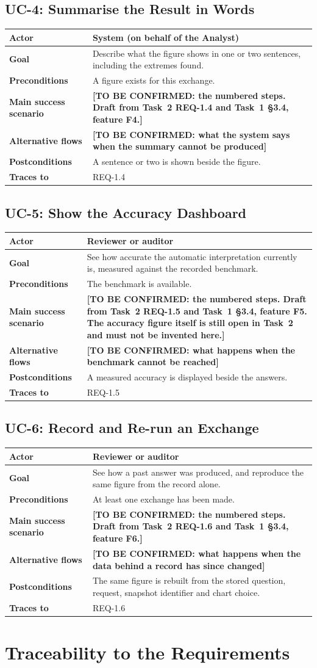 \documentclass[12pt,a4paper]{report}
\makeatletter
\newcommand{\tbd}[1]{{\color{red}\textbf{[TO BE CONFIRMED: #1]}}}
\newcommand{\ucdesc}[7]{%
  \begin{table}[H]
  \centering
  {\small
  \setlength{\tabcolsep}{4.5pt}
  \begin{tabular}{@{}>{\bfseries}p{2.9cm} >{\raggedright\arraybackslash}p{12.2cm}@{}}
    \toprule[1.5pt]
    Actor & #1 \\ \midrule
    Goal & #2 \\ \midrule
    Preconditions & #3 \\ \midrule
    Main success scenario & #4 \\ \midrule
    Alternative flows & #5 \\ \midrule
    Postconditions & #6 \\ \midrule
    Traces to & #7 \\
    \bottomrule[1.5pt]
  \end{tabular}}
  \end{table}
}
\makeatother
\begin{document}
\subsection{UC-4: Summarise the Result in Words}
\label{uc:4}
\ucdesc{System (on behalf of the Analyst)}
  {Describe what the figure shows in one or two sentences, including the
   extremes found.}
  {A figure exists for this exchange.}
  {\tbd{the numbered steps. Draft from Task~2 REQ-1.4 and Task~1 \S3.4,
   feature F4.}}
  {\tbd{what the system says when the summary cannot be produced}}
  {A sentence or two is shown beside the figure.}
  {REQ-1.4}

\subsection{UC-5: Show the Accuracy Dashboard}
\label{uc:5}
\ucdesc{Reviewer or auditor}
  {See how accurate the automatic interpretation currently is, measured
   against the recorded benchmark.}
  {The benchmark is available.}
  {\tbd{the numbered steps. Draft from Task~2 REQ-1.5 and Task~1 \S3.4,
   feature F5. \textbf{The accuracy figure itself is still open in Task~2
   and must not be invented here.}}}
  {\tbd{what happens when the benchmark cannot be reached}}
  {A measured accuracy is displayed beside the answers.}
  {REQ-1.5}

\subsection{UC-6: Record and Re-run an Exchange}
\label{uc:6}
\ucdesc{Reviewer or auditor}
  {See how a past answer was produced, and reproduce the same figure from
   the record alone.}
  {At least one exchange has been made.}
  {\tbd{the numbered steps. Draft from Task~2 REQ-1.6 and Task~1 \S3.4,
   feature F6.}}
  {\tbd{what happens when the data behind a record has since changed}}
  {The same figure is rebuilt from the stored question, request, snapshot
   identifier and chart choice.}
  {REQ-1.6}

\section{Traceability to the Requirements}
\label{sec:uc-trace}
\end{document}
